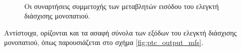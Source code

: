 \bigskip
\begin{figure}[!ht]
	\centering
	\\
	\caption{Οι συναρτήσεις συμμετοχής των μεταβλητών εισόδου του ελεγκτή διάσχισης μονοπατιού.}
	\label{fig:ptc_input_mfs}
\end{figure}

\bigskip
Αντίστοιχα, ορίζονται και τα ασαφή σύνολα των εξόδων του ελεγκτή διάσχισης μονοπατιού, όπως παρουσιάζεται στο σχήμα \ref{fig:ptc_output_mfs}.

